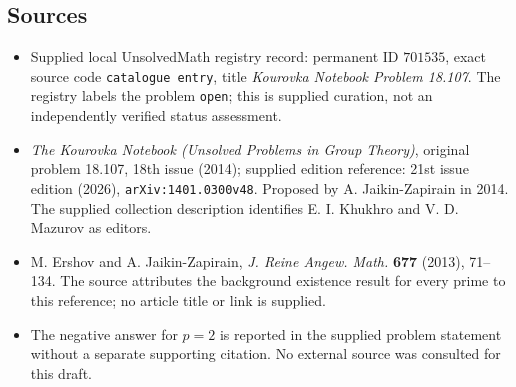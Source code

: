 \documentclass[11pt]{article}
\begin{document}
\subsection{Sources}
\begin{itemize}
\item Supplied local UnsolvedMath registry record: permanent ID \(701535\), exact source code \texttt{catalogue entry}, title \emph{Kourovka Notebook Problem 18.107}. The registry labels the problem \texttt{open}; this is supplied curation, not an independently verified status assessment.
\item \emph{The Kourovka Notebook (Unsolved Problems in Group Theory)}, original problem 18.107, 18th issue (2014); supplied edition reference: 21st issue edition (2026), \texttt{arXiv:1401.0300v48}. Proposed by A. Jaikin-Zapirain in 2014. The supplied collection description identifies E. I. Khukhro and V. D. Mazurov as editors.
\item M. Ershov and A. Jaikin-Zapirain, \emph{J. Reine Angew. Math.} \textbf{677} (2013), 71--134. The source attributes the background existence result for every prime to this reference; no article title or link is supplied.
\item The negative answer for \(p=2\) is reported in the supplied problem statement without a separate supporting citation. No external source was consulted for this draft.
\end{itemize}
\end{document}
